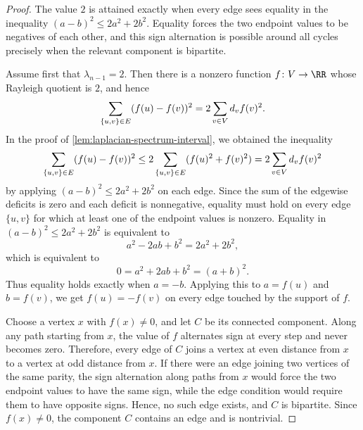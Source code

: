 \begin{proof}
	The value \(2\) is attained exactly when every edge sees equality in the inequality \((a-b)^2\leq 2a^2+2b^2\). Equality forces the two endpoint values to be negatives of each other, and this sign alternation is possible around all cycles precisely when the relevant component is bipartite.

	Assume first that \(\lambda_{n-1}=2\). Then there is a nonzero function \(f\colon \Vertices\to\RR\) whose Rayleigh quotient is \(2\), and hence
	\begin{equation}
		\sum_{\{u,v\}\in E}(f(u)-f(v))^2=2\sum_{v\in V}d_v f(v)^2.
	\end{equation}
	In the proof of \cref{lem:laplacian-spectrum-interval}, we obtained the inequality
	\begin{equation}
		\sum_{\{u,v\}\in E}(f(u)-f(v))^2
		\leq
		2\sum_{\{u,v\}\in E}(f(u)^2+f(v)^2)
		=
		2\sum_{v\in V}d_v f(v)^2
	\end{equation}
	by applying \((a-b)^2\leq 2a^2+2b^2\) on each edge. Since the sum of the edgewise deficits is zero and each deficit is nonnegative, equality must hold on every edge \(\{u,v\}\) for which at least one of the endpoint values is nonzero. Equality in \((a-b)^2\leq 2a^2+2b^2\) is equivalent to
	\begin{equation}
		a^2-2ab+b^2=2a^2+2b^2,
	\end{equation}
	which is equivalent to
	\begin{equation}
		0=a^2+2ab+b^2=(a+b)^2.
	\end{equation}
	Thus equality holds exactly when \(a=-b\). Applying this to \(a=f(u)\) and \(b=f(v)\), we get \(f(u)=-f(v)\) on every edge touched by the support of \(f\).

	Choose a vertex \(x\) with \(f(x)\neq 0\), and let \(C\) be its connected component. Along any path starting from \(x\), the value of \(f\) alternates sign at every step and never becomes zero. Therefore, every edge of \(C\) joins a vertex at even distance from \(x\) to a vertex at odd distance from \(x\). If there were an edge joining two vertices of the same parity, the sign alternation along paths from \(x\) would force the two endpoint values to have the same sign, while the edge condition would require them to have opposite signs. Hence, no such edge exists, and \(C\) is bipartite. Since \(f(x)\neq 0\), the component \(C\) contains an edge and is nontrivial.


\end{proof}
